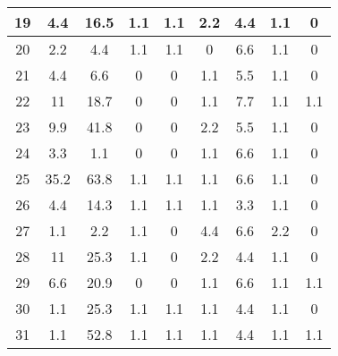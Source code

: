 \begin{table}[h!]
\begin{tabular}{|c|c|c|c|c|c|c|c|c|}
19           & 4.4   & 16.5  & 1.1   & 1.1   & 2.2   & 4.4  & 1.1   & 0     \\ \hline
20           & 2.2   & 4.4   & 1.1   & 1.1   & 0     & 6.6  & 1.1   & 0     \\ \hline
21           & 4.4   & 6.6   & 0     & 0     & 1.1   & 5.5  & 1.1   & 0     \\ \hline
22           & 11    & 18.7  & 0     & 0     & 1.1   & 7.7  & 1.1   & 1.1   \\ \hline
23           & 9.9   & 41.8  & 0     & 0     & 2.2   & 5.5  & 1.1   & 0     \\ \hline
24           & 3.3   & 1.1   & 0     & 0     & 1.1   & 6.6  & 1.1   & 0     \\ \hline
25           & 35.2  & 63.8  & 1.1   & 1.1   & 1.1   & 6.6  & 1.1   & 0     \\ \hline
26           & 4.4   & 14.3  & 1.1   & 1.1   & 1.1   & 3.3  & 1.1   & 0     \\ \hline
27           & 1.1   & 2.2   & 1.1   & 0     & 4.4   & 6.6  & 2.2   & 0     \\ \hline
28           & 11    & 25.3  & 1.1   & 0     & 2.2   & 4.4  & 1.1   & 0     \\ \hline
29           & 6.6   & 20.9  & 0     & 0     & 1.1   & 6.6  & 1.1   & 1.1   \\ \hline
30           & 1.1   & 25.3  & 1.1   & 1.1   & 1.1   & 4.4  & 1.1   & 0     \\ \hline
31           & 1.1   & 52.8  & 1.1   & 1.1   & 1.1   & 4.4  & 1.1   & 1.1   \\ \hline
\end{tabular}
\end{table}



